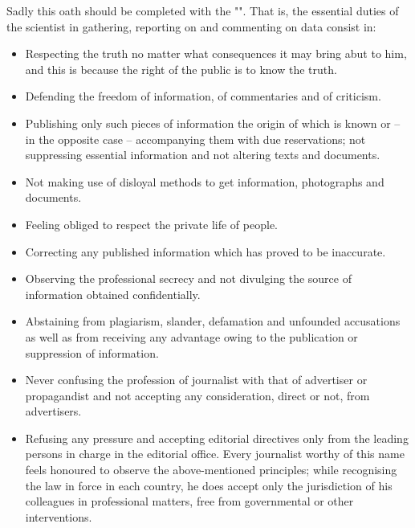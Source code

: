 Sadly this oath should be completed with the "". That is, the essential duties of the scientist in gathering, reporting on and commenting on data consist in:
\begin{itemize}
	\item Respecting the truth no matter what consequences it may bring abut to him, and this is because the right of the public is to know the truth.

	\item Defending the freedom of information, of commentaries and of criticism.

	\item Publishing only such pieces of information the origin of which is known or – in the opposite case – accompanying them with due reservations; not suppressing essential information and not altering texts and documents.

	\item Not making use of disloyal methods to get information, photographs and documents.

	\item Feeling obliged to respect the private life of people.

	\item Correcting any published information which has proved to be inaccurate.

	\item Observing the professional secrecy and not divulging the source of information obtained confidentially.

	\item Abstaining from plagiarism, slander, defamation and unfounded accusations as well as from receiving any advantage owing to the publication or suppression of information.

	\item Never confusing the profession of journalist with that of advertiser or propagandist and not accepting any consideration, direct or not, from advertisers.

	\item Refusing any pressure and accepting editorial directives only from the leading persons in charge in the editorial office. Every journalist worthy of this name feels honoured to observe the above-mentioned principles; while recognising the law in force in each country, he does accept only the jurisdiction of his colleagues in professional matters, free from governmental or other interventions.
\end{itemize}


